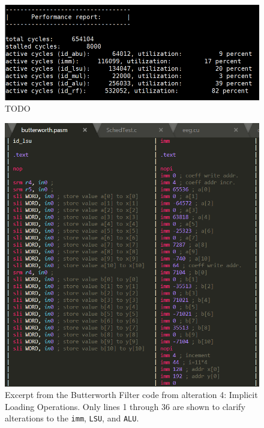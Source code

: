 \documentclass[letterpaper, 10 pt, conference]{ieeeconf}  %
\begin{document}
\begin{figure}[h]
\begin{center}
\includegraphics[scale=0.35]{images/O202.png}
\caption{TODO}
\label{fig:TODO}
\end{center}
\end{figure}




\begin{figure}[h]
\begin{center}
\includegraphics[scale=0.35]{images/assem01.png}
\caption{Excerpt from the Butterworth Filter code from alteration 4: Implicit Loading Operations. Only lines 1 through 36 are shown to clarify alterations to the \texttt{imm}, \texttt{LSU}, and \texttt{ALU}.}
\label{fig:TODO}
\end{center}
\end{figure}
\end{document}
